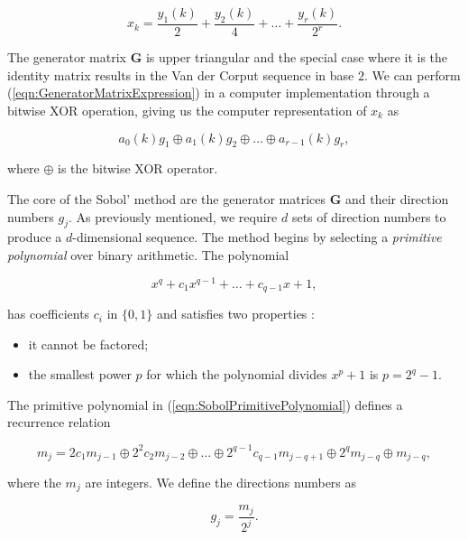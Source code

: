 \begin{equation*}
    x_k = \frac{y_1(k)}{2} + \frac{y_2(k)}{4} + \dots + \frac{y_r(k)}{2^r}.
\end{equation*}

The generator matrix $\boldsymbol{G}$ is upper triangular and the special case where it is the identity matrix results in the Van der Corput sequence in base $2$. We can perform (\ref{eqn:GeneratorMatrixExpression}) in a computer implementation through a bitwise XOR operation, giving us the computer representation of $x_k$ as

\begin{equation*}
    a_0(k)g_1 \oplus a_1(k)g_2 \oplus \dots \oplus a_{r-1}(k)g_r,
\end{equation*}

where $\oplus$ is the bitwise XOR operator.

The core of the Sobol' method are the generator matrices $\boldsymbol{G}$ and their direction numbers $g_j$. As previously mentioned, we require $d$ sets of direction numbers to produce a $d$-dimensional sequence. The method begins by selecting a \textit{primitive polynomial} over binary arithmetic. The polynomial

\begin{equation} \label{eqn:SobolPrimitivePolynomial}
    x^q + c_1x^{q-1} + \dots + c_{q-1}x + 1,
\end{equation}

has coefficients $c_i$ in $\{0,1\}$ and satisfies two properties \cite{glasserman2004monte}:

\begin{itemize}
    \item it cannot be factored;
    \item the smallest power $p$ for which the polynomial divides $x^p + 1$ is $p = 2^q - 1$.
\end{itemize}

The primitive polynomial in (\ref{eqn:SobolPrimitivePolynomial}) defines a recurrence relation

\begin{equation} \label{eqn:SobolRecurrenceRelation}
    m_j = 2c_1m_{j-1} \oplus 2^2c_2m_{j-2} \oplus \dots \oplus 2^{q-1}c_{q-1}m_{j-q+1} \oplus 2^qm_{j-q} \oplus m_{j-q},
\end{equation}

where the $m_j$ are integers. We define the directions numbers as

\begin{equation*}
    g_j = \frac{m_j}{2^j}.
\end{equation*}

